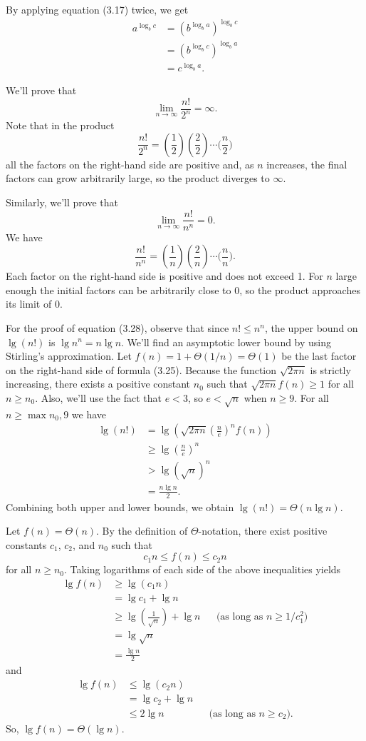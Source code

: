 \subexercise
By applying equation (3.17) twice, we get
\begin{align*}
    a^{\log_bc} &= (b^{\log_ba})^{\log_bc} \\
    &= (b^{\log_bc})^{\log_ba} \\
    &= c^{\log_ba}.
\end{align*}

\subexercise
We'll prove that
\[
    \lim_{n\to\infty}\frac{n!}{2^n} = \infty.
\]
Note that in the product
\[
    \frac{n!}{2^n} = \left(\frac{1}{2}\right)\left(\frac{2}{2}\right)\cdots\biggl(\frac{n}{2}\biggr)
\]
all the factors on the right-hand side are positive and, as $n$ increases, the final factors can grow arbitrarily large, so the product diverges to $\infty$.

Similarly, we'll prove that
\[
    \lim_{n\to\infty}\frac{n!}{n^n} = 0.
\]
We have
\[
    \frac{n!}{n^n} = \left(\frac{1}{n}\right)\left(\frac{2}{n}\right)\cdots\biggl(\frac{n}{n}\biggr).
\]
Each factor on the right-hand side is positive and does not exceed 1.
For $n$ large enough the initial factors can be arbitrarily close to 0, so the product approaches its limit of 0.

For the proof of equation (3.28), observe that since $n!\le n^n$, the upper bound on $\lg(n!)$ is $\lg n^n=n\lg n$.
We'll find an asymptotic lower bound by using Stirling's approximation.
Let $f(n)=1+\Theta(1/n)=\Theta(1)$ be the last factor on the right-hand side of formula (3.25).
Because the function $\!\sqrt{2\pi n}$ is strictly increasing, there exists a positive constant $n_0$ such that $\!\sqrt{2\pi n}f(n)\ge1$ for all $n\ge n_0$.
Also, we'll use the fact that $e<3$, so $e<\!\sqrt{n}$ when $n\ge9$.
For all $n\ge\max{n_0,9}$ we have
\begin{align*}
    \lg(n!) &= \lg\left(\!\sqrt{2\pi n}\left(\frac{n}{e}\right)^n\!f(n)\right) \\
    &\ge \lg\left(\frac{n}{e}\right)^n \\[1mm]
    &> \lg\left(\!\sqrt{n}\right)^n \\[1mm]
    &= \frac{n\lg n}{2}.
\end{align*}
Combining both upper and lower bounds, we obtain $\lg(n!)=\Theta(n\lg n)$.

\subexercise
Let $f(n)=\Theta(n)$.
By the definition of $\Theta$-notation, there exist positive constants $c_1$, $c_2$, and $n_0$ such that
\[
    c_1n \le f(n) \le c_2n
\]
for all $n\ge n_0$.
Taking logarithms of each side of the above inequalities yields
\begin{align*}
    \lg f(n) &\ge \lg(c_1n) \\
    &= \lg c_1+\lg n \\
    &\ge \lg\left(\frac{1}{\!\sqrt{n}}\right)+\lg n && \text{(as long as $n\ge1/c_1^2$)} \\
    &= \lg\!\sqrt{n} \\
    &= \frac{\lg n}{2}
\end{align*}
and
\begin{align*}
    \lg f(n) &\le \lg(c_2n) \\
    &= \lg c_2+\lg n \\
    &\le 2\lg n && \text{(as long as $n\ge c_2$)}.
\end{align*}
So, $\lg f(n)=\Theta(\lg n)$.
